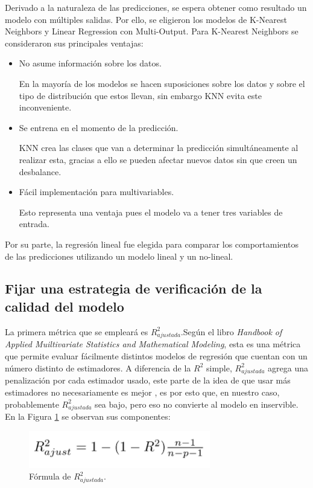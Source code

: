 \documentclass{article}
\begin{document}
Derivado a la naturaleza de las predicciones,  se espera obtener como resultado un modelo con múltiples salidas. Por ello, se eligieron los modelos de K-Nearest Neighbors y Linear Regression con Multi-Output.
Para K-Nearest Neighbors se consideraron sus principales ventajas:
\begin{itemize}
    \item No asume información sobre los datos.
    
    En la mayoría de los modelos se hacen suposiciones sobre los datos y sobre el tipo de distribución que estos llevan, sin embargo KNN evita este inconveniente.\cite{BonnerL2018}
    \item Se entrena en el momento de la predicción.
    
    KNN crea las clases que van a determinar la predicción simultáneamente al realizar esta, gracias a ello se pueden afectar nuevos datos sin que creen un desbalance.\cite{BonnerL2018}
    \item Fácil implementación para multivariables.
    
    Esto representa una ventaja pues el modelo va a tener tres variables de entrada.
    \cite{BonnerL2018} 
\end{itemize}

Por su parte, la regresión lineal fue elegida para comparar los comportamientos de las predicciones utilizando un modelo lineal y un no-lineal.

\subsection{Fijar una estrategia de verificación de la calidad del modelo}
La primera métrica que se empleará es $R^{2}_{ajustada}$.Según el libro \emph{Handbook of Applied Muiltivariate Statistics and Mathematical Modeling}, esta es una métrica que permite evaluar fácilmente distintos modelos de regresión que cuentan con un número distinto de estimadores. A diferencia de la $R^2$ simple, $R^{2}_{ajustada}$ agrega una penalización por cada estimador usado, este parte de la idea de que usar más estimadores no necesariamente es mejor \cite{handbook}, es por esto que, en nuestro caso, probablemente $R^{2}_{ajustada}$ sea bajo, pero eso no convierte al modelo en inservible. En la Figura \ref{fig:R2Ajustada} se observan sus componentes:
\begin{figure}[h!]
    \centering
    \includegraphics[scale=.7]{F4/F4-RAjustada.PNG}
    \caption{Fórmula de $R^{2}_{ajustada}$.\cite{RajustadaCita}}
    \label{fig:R2Ajustada}
\end{figure}
\end{document}
